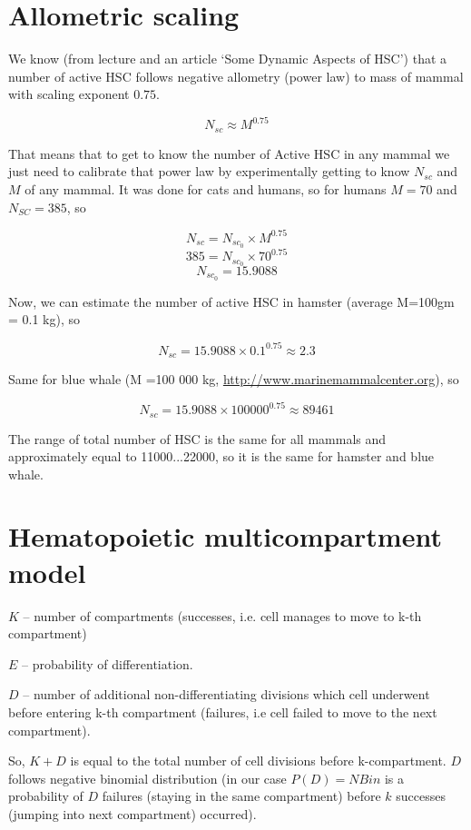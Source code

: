 \newcommand{\package}{\emph}

\setcounter{chapter}{1}
\setcounter{section}{0}
\section{Allometric scaling}
We know (from lecture and an article ‘Some Dynamic Aspects of HSC’) that a number of active HSC follows negative allometry (power law) to mass of mammal with scaling exponent $0.75$. 

\[ N_{sc} \approx M^{0.75} \]

That means that to get to know the number of Active HSC in any mammal we just need to calibrate that power law by experimentally getting to know $N_{sc}$ and $M$ of any mammal. It was done for cats and humans, so for humans $M=70$ and $N_{SC}=385$, so

\[ N_{sc}= N_{sc_0}\times M^{0.75} \]
\[ 385=N_{sc_0}\times 70^{0.75} \]
\[N_{sc_0}=15.9088\]

Now, we can estimate the number of active HSC in hamster (average M=100gm = 0.1 kg), so

\[ N_{sc}= 15.9088 \times 0.1^{0.75} \approx 2.3 \]

Same for blue whale (M =100 000 kg, \url{http://www.marinemammalcenter.org}), so

\[ N_{sc}= 15.9088 \times 100000^{0.75} \approx 89 461 \]

The range of total number of HSC is the same for all mammals and approximately equal to 11000...22000, so it is the same for hamster and blue whale.

\setcounter{chapter}{2}
\setcounter{section}{0}
\section{Hematopoietic multicompartment model}
$K$ – number of compartments (successes, i.e. cell manages to move to k-th compartment) 

$E$ – probability of differentiation.

$D$ – number of additional non-differentiating divisions which cell underwent before entering k-th compartment (failures, i.e cell failed to move to the next compartment).

So, $K+D$  is equal to the total number of cell divisions before k-compartment.
$D$ follows negative binomial distribution (in our case $P(D)=NBin$ is a probability of $D$ failures (staying in the same compartment) before $k$ successes (jumping into next compartment) occurred).

